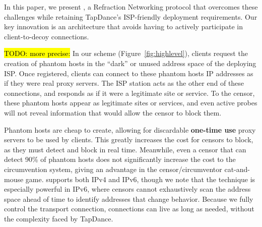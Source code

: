 \documentclass[letterpaper,twocolumn,10pt]{article}
\newcommand{\TODO}[1]{\hl{TODO: #1}\xspace}
\begin{document}
\smallskip

In this paper, we present \textbf{\scheme}, a Refraction
Networking protocol that overcomes these challenges while retaining
TapDance's ISP-friendly deployment requirements.
Our key innovation is an architecture that avoids
having to actively participate in client-to-decoy connections.

\TODO{more precise:}
In our scheme (Figure~\ref{fig:highlevel}), clients
request the creation of phantom hosts in the ``dark''
or unused address space of the deploying ISP. Once registered, clients
can connect to these phantom hosts IP addresses as if they were real
proxy servers. The ISP station acts as the other end of these connections, and
responds as if it were a legitimate site or service. To the censor,
these phantom hosts appear as legitimate sites or services, and even
active probes will not reveal information that would allow the censor to
block them.



Phantom hosts are cheap to create, allowing for discardable \textbf{one-time use}
proxy servers to be used by clients. This greatly increases the cost for censors to
block, as they must detect and block in real time. Meanwhile, even a censor that
can detect 90\% of phantom hosts does not significantly increase the cost to the
circumvention system, giving \scheme an advantage in the censor/circumventor
cat-and-mouse game.
\scheme supports both IPv4 and IPv6, though we note that the technique is especially
powerful in IPv6, where censors cannot exhaustively scan the address space
ahead of time to identify addresses that change behavior.
Because we fully control the transport connection, connections can live as
long as needed, without the complexity faced by TapDance.

\end{document}
